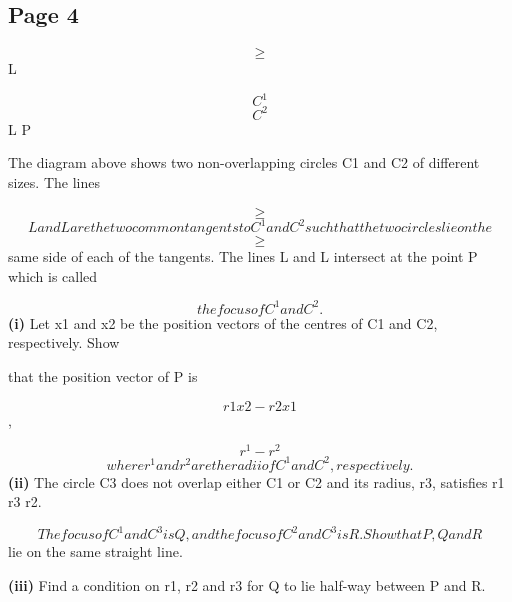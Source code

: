 \documentclass[12pt]{article}
\begin{document}
\subsection*{Page 4}
\begin{flushleft}
\[\geq\]
L\par
\[C^1\]
\[C^2\]
L P\par
The diagram above shows two non-overlapping circles C1 and C2 of different sizes. The lines\par
\[\geq\]
\[L and L are the two common tangents to C^1 and C^2 such that the two circles lie on the\]
\[\geq\]
same side of each of the tangents. The lines L and L intersect at the point P which is called\par
\[the focus of C^1 and C^2.\]
\textbf{(i)} Let x1 and x2 be the position vectors of the centres of C1 and C2, respectively. Show\par
that the position vector of P is\par
\[r1x2 - r2x1\]
,\par
\[r^1 - r^2\]
\[where r^1 and r^2 are the radii of C^1 and C^2, respectively.\]
\textbf{(ii)} The circle C3 does not overlap either C1 or C2 and its radius, r3, satisfies r1 \ne r3 \ne r2.\par
\[The focus of C^1 and C^3 is Q, and the focus of C^2 and C^3 is R. Show that P , Q and R\]
lie on the same straight line.\par
\textbf{(iii)} Find a condition on r1, r2 and r3 for Q to lie half-way between P and R.\par
\end{flushleft}
\end{document}
